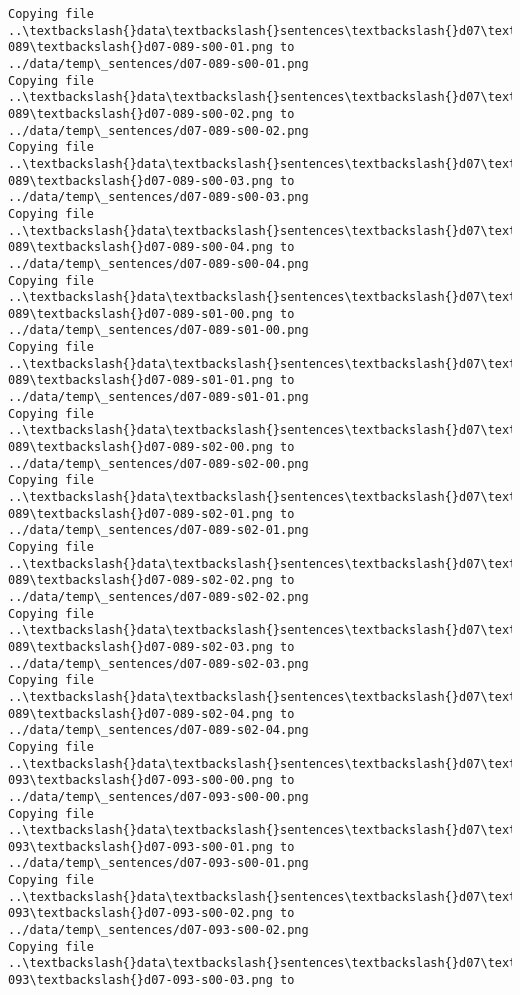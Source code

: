 \documentclass[11pt]{article}
\begin{document}
\begin{Verbatim}[commandchars=\\\{\}]
Copying file ..\textbackslash{}data\textbackslash{}sentences\textbackslash{}d07\textbackslash{}d07-089\textbackslash{}d07-089-s00-01.png to
../data/temp\_sentences/d07-089-s00-01.png
Copying file ..\textbackslash{}data\textbackslash{}sentences\textbackslash{}d07\textbackslash{}d07-089\textbackslash{}d07-089-s00-02.png to
../data/temp\_sentences/d07-089-s00-02.png
Copying file ..\textbackslash{}data\textbackslash{}sentences\textbackslash{}d07\textbackslash{}d07-089\textbackslash{}d07-089-s00-03.png to
../data/temp\_sentences/d07-089-s00-03.png
Copying file ..\textbackslash{}data\textbackslash{}sentences\textbackslash{}d07\textbackslash{}d07-089\textbackslash{}d07-089-s00-04.png to
../data/temp\_sentences/d07-089-s00-04.png
Copying file ..\textbackslash{}data\textbackslash{}sentences\textbackslash{}d07\textbackslash{}d07-089\textbackslash{}d07-089-s01-00.png to
../data/temp\_sentences/d07-089-s01-00.png
Copying file ..\textbackslash{}data\textbackslash{}sentences\textbackslash{}d07\textbackslash{}d07-089\textbackslash{}d07-089-s01-01.png to
../data/temp\_sentences/d07-089-s01-01.png
Copying file ..\textbackslash{}data\textbackslash{}sentences\textbackslash{}d07\textbackslash{}d07-089\textbackslash{}d07-089-s02-00.png to
../data/temp\_sentences/d07-089-s02-00.png
Copying file ..\textbackslash{}data\textbackslash{}sentences\textbackslash{}d07\textbackslash{}d07-089\textbackslash{}d07-089-s02-01.png to
../data/temp\_sentences/d07-089-s02-01.png
Copying file ..\textbackslash{}data\textbackslash{}sentences\textbackslash{}d07\textbackslash{}d07-089\textbackslash{}d07-089-s02-02.png to
../data/temp\_sentences/d07-089-s02-02.png
Copying file ..\textbackslash{}data\textbackslash{}sentences\textbackslash{}d07\textbackslash{}d07-089\textbackslash{}d07-089-s02-03.png to
../data/temp\_sentences/d07-089-s02-03.png
Copying file ..\textbackslash{}data\textbackslash{}sentences\textbackslash{}d07\textbackslash{}d07-089\textbackslash{}d07-089-s02-04.png to
../data/temp\_sentences/d07-089-s02-04.png
Copying file ..\textbackslash{}data\textbackslash{}sentences\textbackslash{}d07\textbackslash{}d07-093\textbackslash{}d07-093-s00-00.png to
../data/temp\_sentences/d07-093-s00-00.png
Copying file ..\textbackslash{}data\textbackslash{}sentences\textbackslash{}d07\textbackslash{}d07-093\textbackslash{}d07-093-s00-01.png to
../data/temp\_sentences/d07-093-s00-01.png
Copying file ..\textbackslash{}data\textbackslash{}sentences\textbackslash{}d07\textbackslash{}d07-093\textbackslash{}d07-093-s00-02.png to
../data/temp\_sentences/d07-093-s00-02.png
Copying file ..\textbackslash{}data\textbackslash{}sentences\textbackslash{}d07\textbackslash{}d07-093\textbackslash{}d07-093-s00-03.png to

\end{Verbatim}
\end{document}
